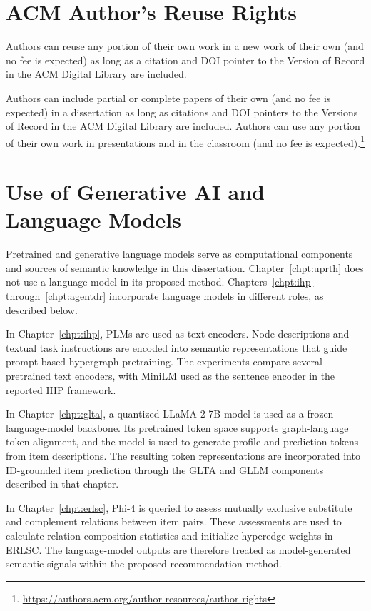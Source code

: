 
\chapter{ACM Author's Reuse Rights}


Authors can reuse any portion of their own work in a new work of their own (and no fee is expected) as long as a citation and DOI pointer to the Version of Record in the ACM Digital Library are included.

Authors can include partial or complete papers of their own (and no fee is expected) in a dissertation as long as citations and DOI pointers to the Versions of Record in the ACM Digital Library are included. Authors can use any portion of their own work in presentations and in the classroom (and no fee is expected).\footnote{\url{https://authors.acm.org/author-resources/author-rights}}


\chapter{Use of Generative AI and Language Models}

Pretrained and generative language models serve as computational components and sources of semantic knowledge in this dissertation. Chapter~\ref{chpt:uprth} does not use a language model in its proposed method. Chapters~\ref{chpt:ihp} through~\ref{chpt:agentdr} incorporate language models in different roles, as described below.

In Chapter~\ref{chpt:ihp}, PLMs are used as text encoders. Node descriptions and textual task instructions are encoded into semantic representations that guide prompt-based hypergraph pretraining. The experiments compare several pretrained text encoders, with MiniLM used as the sentence encoder in the reported IHP framework.

In Chapter~\ref{chpt:glta}, a quantized LLaMA-2-7B model is used as a frozen language-model backbone. Its pretrained token space supports graph-language token alignment, and the model is used to generate profile and prediction tokens from item descriptions. The resulting token representations are incorporated into ID-grounded item prediction through the GLTA and GLLM components described in that chapter.

In Chapter~\ref{chpt:erlsc}, Phi-4 is queried to assess mutually exclusive substitute and complement relations between item pairs. These assessments are used to calculate relation-composition statistics and initialize hyperedge weights in ERLSC. The language-model outputs are therefore treated as model-generated semantic signals within the proposed recommendation method.


